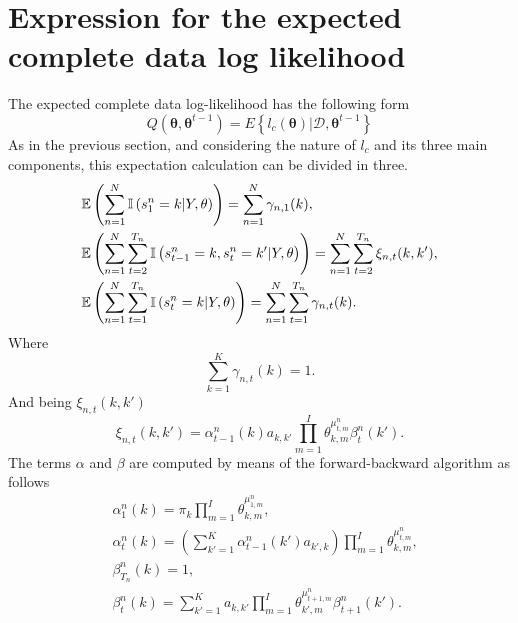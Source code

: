 \documentclass[12pt]{article}
\newcommand{\indicator}{\mathbb{I}}
\begin{document}
\section{Expression for the expected complete data log likelihood}
The expected complete data log-likelihood has the following form
\begin{equation}
Q \left( \boldsymbol { \theta } , \boldsymbol { \theta } ^ { t - 1 } \right) = E \left\{ l _ { c } ( \boldsymbol { \theta } ) | \mathcal { D } , \boldsymbol { \theta } ^ { t - 1 } \right\}
\end{equation}
As in the previous section, and considering the nature of $l_{c}$ and its three main components, this expectation calculation can be divided in three.
\begin{align}
& \expectation \left( \sum _ { n = 1 } ^ { N } \indicator \left( s _ { 1 } ^ { n } = k | Y , \theta \right) \right) = \sum _ { n = 1 } ^ { N } \gamma _ { n , 1 } ( k ), \\
& \expectation \left( \sum _ { n = 1 } ^ { N } \sum _ { t = 2 } ^ { T _ { n } } \indicator \left( s _ { t - 1 } ^ { n } = k , s _ { t } ^ { n } = k' | Y , \theta \right) \right) = \sum _ { n = 1 } ^ { N } \sum _ { t = 2 } ^ { T _ { n } } \xi _ { n , t } ( k , k' ), \\
& \expectation \left( \sum _ { n = 1 } ^ { N } \sum _ { t = 1 } ^ { T _ { n } } \indicator \left( s _ { t } ^ { n } = k | Y , \theta \right) \right) = \sum _ { n = 1 } ^ { N } \sum _ { t = 1 } ^ { T _ { n } } \gamma _ { n , t } ( k ).
\end{align}
Where 
\begin{equation}
\sum _ { k = 1 } ^ { K } \gamma _ { n , t } ( k ) = 1.
\end{equation}
\noindent And being $\xi _ { n,t } ( k , k' )$ 
\begin{equation}
\xi _ { n,t } ( k , k' ) = \alpha _ { t -1}^{n} ( k ) a _ { k,k' } \prod\limits_{m=1}^{I} \theta_{k,m}^{\mu^{n}_{t,m}} \beta _ { t  }^{n} ( k' ).
\end{equation}
The terms $\alpha$ and $\beta$ are computed by means of the forward-backward algorithm as follows
\begin{align}
&\alpha _ { 1 }^{n} ( k ) = \pi _ { k } \prod\limits_{m=1}^{I}\theta_{k,m}^{\mu^{n}_{1,m}}, \\
&\alpha _ { t }^{n} ( k ) = \left( \sum _ { k' = 1 } ^ { K } \alpha _ { t - 1 }^{n} ( k' ) a _ { k',k } \right) \prod\limits_{m=1}^{I}\theta_{k,m}^{\mu^{n}_{t,m}}, \\
&\beta _ { T_{n} }^{n} ( k ) = 1, \\
& \beta _ { t }^{n} ( k ) = \sum _ {k' = 1 } ^ { K } a _ { k,k'}  \prod\limits_{m=1}^{I}\theta_{k',m}^{\mu^{n}_{t+1,m}}  \beta _ { t + 1 }^{n} ( k' ).
\end{align}
\end{document}
